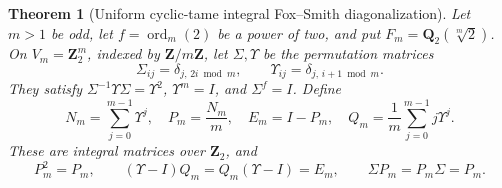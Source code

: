\documentclass[11pt]{article}
\newtheorem{theorem}{Theorem}[section]
\theoremstyle{definition}
\begin{document}
\begin{theorem}[Uniform cyclic-tame integral Fox--Smith diagonalization]
\label{thm:dyadic-f136-uniform-cyclic-tame-smith}
Let $m>1$ be odd, let $f=\operatorname{ord}_m(2)$ be a power
of two, and put $F_m=\mathbf Q_2(\sqrt[m]{2})$.  On
$V_m=\mathbf Z_2^m$, indexed by $\mathbf Z/m\mathbf Z$,
let $\Sigma,\Upsilon$ be the permutation matrices
\[
\Sigma_{ij}=\delta_{j,\,2i\bmod m},\qquad
\Upsilon_{ij}=\delta_{j,\,i+1\bmod m}.
\]
They satisfy $\Sigma^{-1}\Upsilon\Sigma=\Upsilon^2$,
$\Upsilon^m=I$, and $\Sigma^f=I$.  Define
\begin{equation}\label{eq:dyadic-f136-cyclic-tame-projectors}
N_m=\sum_{j=0}^{m-1}\Upsilon^j,\quad
P_m=\frac{N_m}{m},\quad E_m=I-P_m,\quad
Q_m=\frac1m\sum_{j=0}^{m-1}j\Upsilon^j .
\end{equation}
These are \emph{integral} matrices over $\mathbf Z_2$, and
\begin{equation}\label{eq:dyadic-f136-cyclic-tame-inverse}
P_m^2=P_m,\qquad
(\Upsilon-I)Q_m=Q_m(\Upsilon-I)=E_m,\qquad
\Sigma P_m=P_m\Sigma=P_m .
\end{equation}


\end{theorem}
\end{document}
